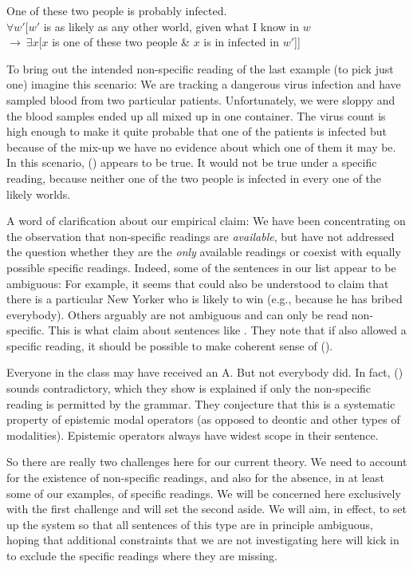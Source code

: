 \ex One of these two people is probably infected.\\
$\forall w'[w'$ is as likely as any other world, given what I know in $w$\\
\null\hfill$ \rightarrow\ \exists x[x$ is one of these two people \& $x$ is in infected in $w'$]]\xe

To bring out the intended non-specific reading of the last example (to pick just
one) imagine this scenario: We are tracking a dangerous virus infection and have
sampled blood from two particular patients. Unfortunately, we were sloppy and
the blood samples ended up all mixed up in one container. The virus count is
high enough to make it quite probable that one of the patients is infected but
because of the mix-up we have no evidence about which one of them it may be. In
this scenario, (\lastx) appears to be true. It would not be true under a
specific reading, because neither one of the two people is infected in every one
of the likely worlds.

A word of clarification about our empirical claim: We have been concentrating on
the observation that non-specific readings are \emph{available}, but have not
addressed the question whether they are the \emph{only} available readings or
coexist with equally possible specific readings. Indeed, some of the sentences
in our list appear to be ambiguous: For example, it seems that  could
also be understood to claim that there is a particular New Yorker who is likely
to win (e.g., because he has bribed everybody). Others arguably are not
ambiguous and can only be read non-specific. This is what
\citet{fintel-iatridou:2003:ec} claim about sentences like . They
note that if  also allowed a specific reading, it should be
possible to make coherent sense of (\nextx).

\ex Everyone in the class may have received an A. But not everybody did. \xe
%
In fact, (\lastx) sounds contradictory, which they show is explained if only the
non-specific reading is permitted by the grammar. They conjecture that this is a
systematic property of epistemic modal operators (as opposed to deontic and
other types of modalities). Epistemic operators always have widest scope in
their sentence.

So there are really two challenges here for our current theory. We need to
account for the existence of non-specific readings, and also for the absence, in
at least some of our examples, of specific readings. We will be concerned here
exclusively with the first challenge and will set the second aside. We will aim,
in effect, to set up the system so that all sentences of this type are in
principle ambiguous, hoping that additional constraints that we are not
investigating here will kick in to exclude the specific readings where they are
missing.

